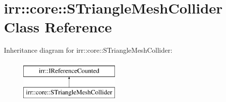 \hypertarget{classirr_1_1core_1_1STriangleMeshCollider}{}\section{irr\+:\+:core\+:\+:S\+Triangle\+Mesh\+Collider Class Reference}
\label{classirr_1_1core_1_1STriangleMeshCollider}
Inheritance diagram for irr\+:\+:core\+:\+:S\+Triangle\+Mesh\+Collider\+:\begin{figure}[H]
\begin{center}
\leavevmode
\includegraphics[height=2.000000cm]{classirr_1_1core_1_1STriangleMeshCollider}
\end{center}
\end{figure}
